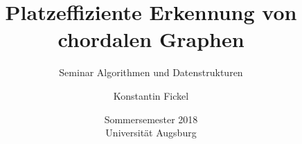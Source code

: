 \documentclass[12pt,a4paper,bibliography=totocnumbered,listof=totocnumbered]{scrartcl}
\title{Platzeffiziente Erkennung von chordalen Graphen}
\subtitle{Seminar \glqq{}Algorithmen und Datenstrukturen\grqq{}}
\author{Konstantin Fickel}
\date{Sommersemester 2018\\Universität Augsburg}
\theoremstyle{hagerup}
\begin{document}
\maketitle{}

\begin{abstract}
	
\end{abstract}

\onehalfspacing

\begingroup








\endgroup

\renewcommand\refname{Literaturverzeichnis}


\end{document}
